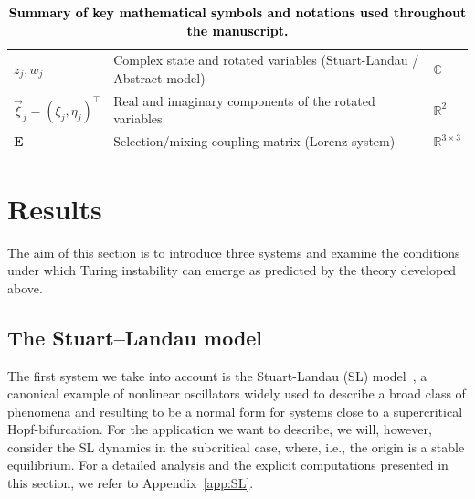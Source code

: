 \documentclass[aps,showpacs,preprintnumbers,amsmath,amssymb,twocolumn,superscriptaddress,floatfix,nofootinbib,10pt,pre]{revtex4-1}
\begin{document}
\begin{table}[ht]
\begin{tabular}{lll}
$z_j, w_j$ & Complex state and rotated variables (Stuart-Landau / Abstract model) & $\mathbb C$ \\
$\vec \xi_j = (\xi_j, \eta_j)^\top$ & Real and imaginary components of the rotated variables & $\mathbb R^2$ \\
$\mathbf E$ & Selection/mixing coupling matrix (Lorenz system) & $\mathbb R^{3\times 3}$ \\
\hline
\end{tabular}
\caption{\textcolor{black}{\textbf{Summary of key mathematical symbols and notations used throughout the manuscript.}}}
\end{table}

\section{Results}
\label{sec:results}

The aim of this section is to introduce three systems and examine the conditions under which Turing instability can emerge as predicted by the theory developed above.

\subsection{The Stuart–Landau model}
\label{ssec:SL}

The first system we take into account is the Stuart-Landau (SL) model~\cite{Stuart1978,vanharten,aranson,garcamorales}, a canonical example of
nonlinear oscillators widely used to describe a broad class of phenomena and resulting to be a normal form for
systems close to a supercritical Hopf-bifurcation. For the application we want to describe, we will, however, consider the SL dynamics in the subcritical case, where, i.e., the origin is a stable equilibrium. For a detailed analysis and the explicit computations presented in this section, we refer to Appendix~\ref{app:SL}.
\end{document}
